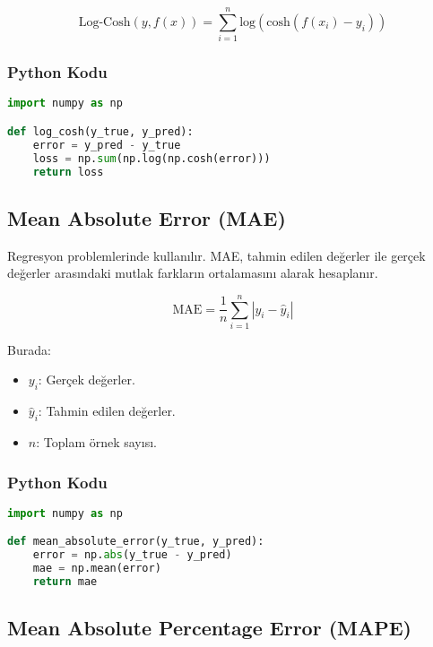 \[ \text{Log-Cosh}(y, f(x)) = \sum_{i=1}^{n} \text{log}(\text{cosh}(f(x_i) - y_i)) \]

\subsubsection{Python Kodu}

\begin{lstlisting}[language=Python]
import numpy as np

def log_cosh(y_true, y_pred):
    error = y_pred - y_true
    loss = np.sum(np.log(np.cosh(error)))
    return loss
\end{lstlisting}

\newpage

\subsection{Mean Absolute Error (MAE)}

Regresyon problemlerinde kullanılır. MAE, tahmin edilen değerler ile gerçek değerler arasındaki mutlak farkların ortalamasını alarak hesaplanır.

\[ \text{MAE} = \frac{1}{n} \sum_{i=1}^{n} |y_i - \hat{y}_i| \]

Burada:

\begin{itemize}
    \item $y_i$: Gerçek değerler.
    \item $\hat{y}_i$: Tahmin edilen değerler.
    \item $n$: Toplam örnek sayısı.
\end{itemize}

\subsubsection{Python Kodu}

\begin{lstlisting}[language=Python]
import numpy as np

def mean_absolute_error(y_true, y_pred):
    error = np.abs(y_true - y_pred)
    mae = np.mean(error)
    return mae
\end{lstlisting}

\newpage

\subsection{Mean Absolute Percentage Error (MAPE)}

